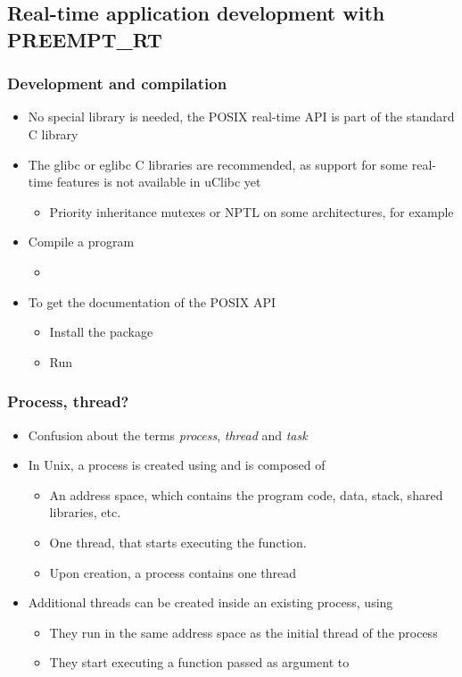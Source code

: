 \subsection{Real-time application development with PREEMPT\_RT}

\begin{frame}
  \frametitle{Development and compilation}
  \begin{itemize}
  \item No special library is needed, the POSIX real-time API is part
    of the standard C library
  \item The glibc or eglibc C libraries are recommended, as support
    for some real-time features is not available in uClibc yet
    \begin{itemize}
    \item Priority inheritance mutexes or NPTL on some architectures,
      for example
    \end{itemize}
  \item Compile a program
    \begin{itemize}
    \item {}
    \end{itemize}
  \item To get the documentation of the POSIX API
    \begin{itemize}
    \item Install the  package
    \item Run 
    \end{itemize}
  \end{itemize}
\end{frame}

\begin{frame}
  \frametitle{Process, thread?}
  \begin{itemize}
  \item Confusion about the terms {\em process}, {\em thread} and {\em task}
  \item In Unix, a process is created using  and is composed of
    \begin{itemize}
    \item An address space, which contains the program code, data, stack, shared
      libraries, etc.
    \item One thread, that starts executing the  function.
    \item Upon creation, a process contains one thread
    \end{itemize}
  \item Additional threads can be created inside an existing process, using
    \begin{itemize}
    \item They run in the same address space as the initial thread of
      the process
    \item They start executing a function passed as argument to
    \end{itemize}
  \end{itemize}
\end{frame}


